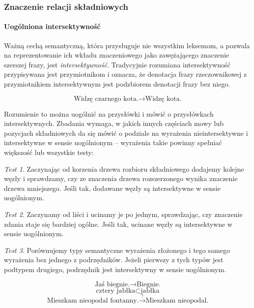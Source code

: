 \documentclass[12pt]{mwart}
\theoremstyle{remark}
\newtheorem{test}{Test}
\begin{document}
\subsubsection{Znaczenie relacji składniowych} %

\paragraph{Uogólniona intersektywność} %
\label{uog_interektywnosc}
Ważną cechą semantyczną, która przysługuje nie wszystkim leksemom, a pozwala na reprezentowanie ich wkładu znaczeniowego jako zawężającego znaczenie szerszej frazy, jest \emph{intersektywność}.
Tradycyjnie rozumiana intersektywność przypisywana jest przymiotnikom i oznacza, że denotacja frazy rzeczownikowej z przymiotnikiem intersektywnym jest podzbiorem denotacji frazy bez niego.

\begin{equation}
\text{Widzę czarnego kota.} \rightarrow \text{Widzę kota.}
\end{equation}


Rozumienie to można uogólnić na przysłówki i mówić o przysłówkach intersektywnych. Zbadania wymaga, w jakich innych częściach mowy lub pozycjach składniowych da się mówić o podziale na wyrażenia nieintersektywne i intersektywne w sensie uogólnionym -- wyrażenia takie powinny spełniać większość lub wszystkie testy:
\begin{test}
Zaczynając od korzenia drzewa rozbioru składniowego dodajemy kolejne węzły i sprawdzamy, czy ze znaczenia drzewa rozszerzonego wynika znaczenie drzewa mniejszego. Jeśli tak, dodawane węzły są intersektywne w sensie uogólnionym.
\end{test}
\begin{test}
Zaczynamy od liści i ucinamy je po jednym, sprawdzając, czy znaczenie zdania staje się bardziej ogólne. Jeśli tak, ucinane węzły są intersektywne w sensie uogólnionym.
\end{test}
\begin{test}
Porównujemy typy semantyczne wyrażenia złożonego i tego samego wyrażenia bez jednego z podrzędników. Jeżeli pierwszy z tych typów jest podtypem drugiego, podrzędnik jest intersektywny w sensie uogólnionym.
\end{test}
\begin{equation}\label{biegnie}
	\text{Jaś biegnie.} \rightarrow \text{Biegnie.}
\end{equation}
\begin{equation}\label{jablka}
	\text{cztery jabłka} \subset \text{jabłka}
\end{equation}
\begin{equation}\label{fontanna}
\text{Mieszkam nieopodal fontanny.} \stackrel{?}{\rightarrow} \text{Mieszkam nieopodal.}
\end{equation}
\end{document}
